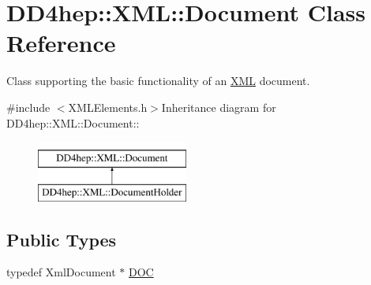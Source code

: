 \hypertarget{class_d_d4hep_1_1_x_m_l_1_1_document}{
\section{DD4hep::XML::Document Class Reference}
\label{class_d_d4hep_1_1_x_m_l_1_1_document}
}


Class supporting the basic functionality of an \hyperlink{namespace_d_d4hep_1_1_x_m_l}{XML} document.  


{\ttfamily \#include $<$XMLElements.h$>$}Inheritance diagram for DD4hep::XML::Document::\begin{figure}[H]
\begin{center}
\leavevmode
\includegraphics[height=2cm]{class_d_d4hep_1_1_x_m_l_1_1_document}
\end{center}
\end{figure}
\subsection*{Public Types}
\begin{DoxyCompactItemize}
\item 
typedef XmlDocument $\ast$ \hyperlink{class_d_d4hep_1_1_x_m_l_1_1_document_a685ff83de83e9b7b37e79ad846fc2387}{DOC}
\end{DoxyCompactItemize}
